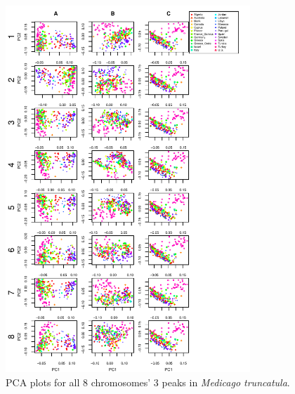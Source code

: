 \documentclass[11pt, oneside]{article}   	%
\begin{document}
\begin{figure}
    \begin{center}
       \includegraphics[width=0.82\textwidth]{FigS_pca_plots_for_Medicago_allchr_3peaks_byMDS}
    \end{center}
    \caption{
        PCA plots for all 8 chromosomes' 3 peaks in \textit{Medicago truncatula}.
        \label{fig:pca_peaks_medicago_allchr}
    }
\end{figure}
\end{document}
